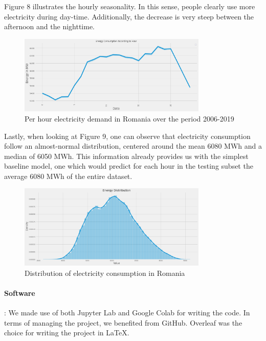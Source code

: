 \documentclass[10pt,twocolumn,letterpaper]{article}
\begin{document}
Figure 8 illustrates the hourly seasonality. In this sense, people clearly use more electricity during day-time. Additionally, the decrease is very steep between the afternoon and the nighttime. 

\begin{figure}[H]
\begin{center}
   \includegraphics[width=9cm]{final-report-latex/Hour.png}
   \caption{Per hour electricity demand in Romania over the period 2006-2019}
   \end{center}
\end{figure}

Lastly, when looking at Figure 9, one can observe that electricity consumption follow an almost-normal distribution, centered around the mean 6080 MWh and a median of 6050 MWh. This information already provides us with the simplest baseline model, one which would predict for each hour in the testing subset the average 6080 MWh of the entire dataset.


\begin{figure}[h]
\begin{center}
   \includegraphics[width=9cm]{final-report-latex/Figure3.png}
   \caption{Distribution of electricity consumption in Romania}
   \end{center}
\end{figure}


\paragraph{Software}: We made use of both Jupyter Lab and Google Colab for writing the code. In terms of managing the project, we benefited from GitHub. Overleaf was the choice for writing the project in \LaTeX.
\end{document}
